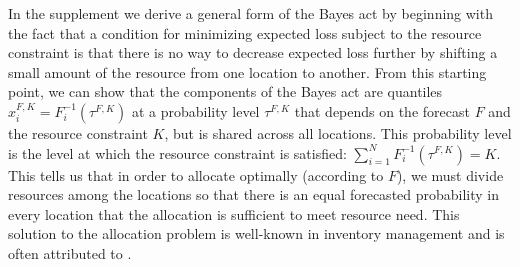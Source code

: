 \documentclass{article}\usepackage[]{graphicx}\usepackage[]{xcolor}
\begin{document}
In the supplement we derive a general form of the Bayes act by beginning with the fact that a condition for minimizing expected loss subject to the resource constraint is that there is no way to decrease expected loss further by shifting a small amount of the resource from one location to another.
From this starting point, we can show that the components of the Bayes act are quantiles $x_i^{F,K} = F_i^{-1}(\tau^{F,K})$ at a probability level $\tau^{F,K}$ that depends on the forecast $F$ and the resource constraint $K$, but is shared across all locations. %
This probability level is the level at which the resource constraint is satisfied: $\sum_{i=1}^N F_i^{-1}(\tau^{F,K}) = K$.
This tells us that in order to allocate optimally (according to $F$), we must divide resources among the locations so that there is an equal forecasted probability in every location that the allocation is sufficient to meet resource need.
This solution to the allocation problem is well-known in inventory management and is often attributed to \cite{hadleywhitin1963}.

\end{document}
